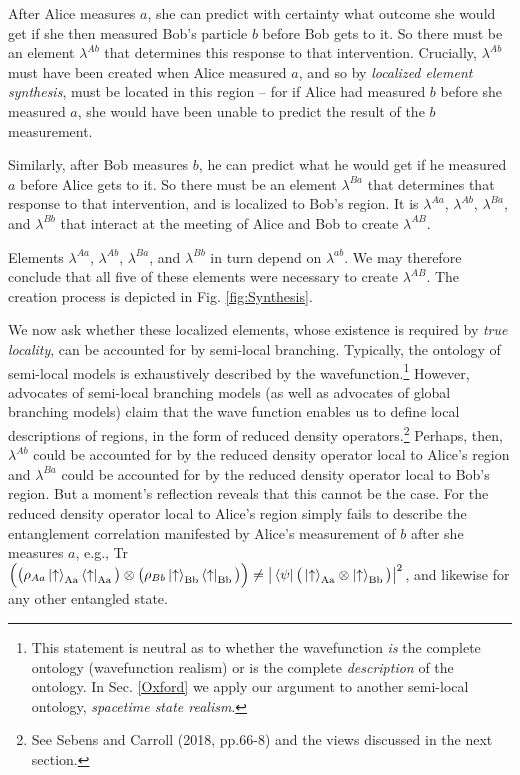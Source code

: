 \documentclass[12pt]{article}
\begin{document}
After Alice measures $a$, she can predict with certainty what outcome she would get if she then measured Bob's particle $b$ before Bob gets to it. 
So there must be an element $\lambda^{Ab}$ that determines this response to that intervention. Crucially, $\lambda^{Ab}$ must have been created when Alice measured $a$, and so by \textit{localized element synthesis}, must be located in this region -- for if Alice had measured $b$ before she measured $a$, she would have been unable to predict the result of the $b$ measurement.  

Similarly, after Bob measures $b$, he can predict what he would get if he measured $a$ before Alice gets to it.  So there must be an element $\lambda^{Ba}$ that determines that response to that intervention, and is localized to Bob's region. It is $\lambda^{Aa}$, $\lambda^{Ab}$, $\lambda^{Ba}$, and $\lambda^{Bb}$ that interact at the meeting of Alice and Bob to create $\lambda^{AB}$. 

Elements $\lambda^{Aa}$, $\lambda^{Ab}$, $\lambda^{Ba}$, and $\lambda^{Bb}$ in turn depend on $\lambda^{ab}$. We may therefore conclude that all five of these elements were necessary to create $\lambda^{AB}$. The creation process is depicted in Fig. \ref{fig:Synthesis}.

We now ask whether these localized elements, whose existence is required by \textit{true locality}, can be accounted for by semi-local branching. Typically, the ontology of semi-local models is exhaustively described by the wavefunction.\footnote{This statement is neutral as to whether the wavefunction \textit{is} the complete ontology (wavefunction realism) or is the complete \textit{description} of the ontology. In Sec. \ref{Oxford} we apply our argument to another semi-local ontology,  \textit{spacetime state realism}.} However, advocates of semi-local branching models (as well as advocates of global branching models) claim that the wave function enables us to define local descriptions of regions, in the form of reduced density operators.\footnote{See Sebens and Carroll (2018, pp.66-8) and the views discussed in the next section.} Perhaps, then, $\lambda^{Ab}$ could be accounted for by the reduced density operator local to Alice's region and $\lambda^{Ba}$ could be accounted for by the reduced density operator local to Bob's region. But a moment's reflection reveals that this cannot be the case. For the reduced density operator local to Alice's region simply fails to describe the entanglement correlation manifested by Alice's measurement of $b$ after she measures $a$, e.g., Tr$\Big(\big(\rho_{Aa} \Ket{\uparrow}_{\rm Aa}\Bra{\uparrow}_{\rm Aa}\big) \otimes  \big(\rho_{Bb}\Ket{\uparrow}_{\rm Bb}\Bra{\uparrow}_{\rm Bb}\big)\Big) \neq \big|\Bra{\psi}\big(\Ket{\uparrow}_{\rm Aa} \otimes \Ket{\uparrow}_{\rm Bb}\big)\big|^2$, and likewise for any other entangled state.
\end{document}
